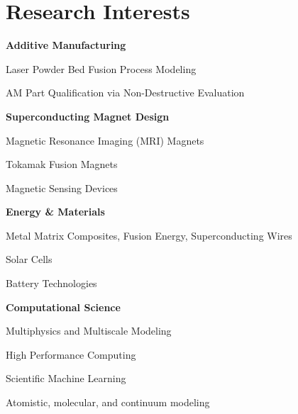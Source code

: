 \documentclass[11pt, letterpaper]{article}
\begin{document}
\section{Research Interests}
   
    \begin{onecolentry}
        \begin{highlightsforbulletentries}
            \item \textbf{Additive Manufacturing}
                \begin{highlightsforbulletentries}
                    \item Laser Powder Bed Fusion Process Modeling
                    \item AM Part Qualification via Non-Destructive Evaluation
                \end{highlightsforbulletentries}
            \item \textbf{Superconducting Magnet Design}
                \begin{highlightsforbulletentries}
                    \item Magnetic Resonance Imaging (MRI) Magnets
                    \item Tokamak Fusion Magnets
                    \item Magnetic Sensing Devices
                \end{highlightsforbulletentries}
            \item \textbf{Energy \& Materials}
                \begin{highlightsforbulletentries}
                    \item Metal Matrix Composites, Fusion Energy, Superconducting Wires
                    \item Solar Cells
                    \item Battery Technologies
                \end{highlightsforbulletentries}
            \item \textbf{Computational Science}
                \begin{highlightsforbulletentries}
                    \item Multiphysics and Multiscale Modeling
                    \item High Performance Computing
                    \item Scientific Machine Learning
                    \item Atomistic, molecular, and continuum modeling
                \end{highlightsforbulletentries}          
        \end{highlightsforbulletentries}
    \end{onecolentry}
    \vspace{0.2 cm}
\end{document}
